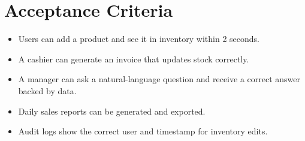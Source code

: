 \section{Acceptance Criteria}
\begin{itemize}
    \item Users can add a product and see it in inventory within 2 seconds.
    \item A cashier can generate an invoice that updates stock correctly.
    \item A manager can ask a natural-language question and receive a correct answer backed by data.
    \item Daily sales reports can be generated and exported.
    \item Audit logs show the correct user and timestamp for inventory edits.
\end{itemize}
